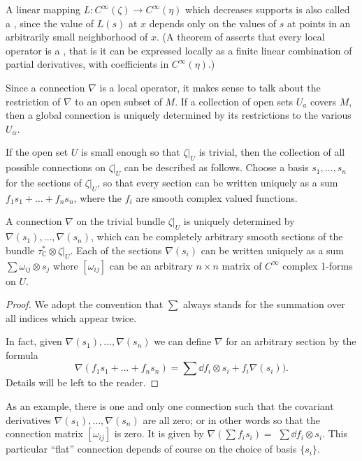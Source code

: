 \documentclass[../main]{subfiles}
\begin{document}
\begin{remark*}
A linear mapping $L: C^\infty (\zeta) \rightarrow C^\infty (\eta)$ which decreases supports is also called a , since the value of $L(s)$ at $x$ depends only on the values of $s$ at points in an arbitrarily small neighborhood of $x$. (A theorem of \cite{peetre} asserts that every local operator is a , that is it can be expressed locally as a finite linear combination of partial derivatives, with coefficients in $C^\infty (\eta)$.)
\end{remark*}

Since a connection $\nabla$ is a local operator, it makes sense to talk about the restriction of $\nabla$ to an open subset of $M$. If a collection of open sets $U_{a}$ covers $M$, then a global connection is uniquely determined by its restrictions to the various $U_{\alpha}$.

If the open set $U$ is small enough so that $\zeta |_U$ is trivial, then the collection of all possible connections on $\zeta |_U$ can be described as follows. Choose a basis $s_{1}, \ldots, s_{n}$ for the sections of $\zeta |_U$, so that every section can be written uniquely as a sum $f_{1} s_{1}+\ldots+f_{n} s_{n}$, where the $f_{i}$ are smooth complex valued functions.

\begin{lemma}
A connection $\nabla$ on the trivial bundle $\zeta |_U$ is uniquely determined by $\nabla(s_{1}), \ldots, \nabla(s_{n})$, which can be completely arbitrary smooth sections of the bundle $\tau_{\mathbb{C}}^{*} \otimes \zeta |_U$. Each of the sections $\nabla(s_{i})$ can be written uniquely as a sum $\sum \omega_{i j} \otimes s_{j}$ where $[\omega_{i j}]$ can be an arbitrary $n \times n$ matrix of $C^\infty $ complex 1-forms on $U$.
\end{lemma}

\begin{proof}
We adopt the convention that $\sum$ always stands for the summation over all indices which appear twice.

In fact, given $\nabla(s_{1}), \ldots, \nabla(s_{n})$ we can define $\nabla$ for an arbitrary section by the formula
\[ \nabla(f_{1} s_{1}+\ldots+f_{n} s_{n})=\sum \dd f_{i} \otimes s_{i}+f_{i} \nabla(s_{i})).\]  Details will be left to the reader.
\end{proof}

As an example, there is one and only one connection such that the covariant derivatives $\nabla(s_{1}), \ldots, \nabla(s_{n})$ are all zero; or in other words so that the connection matrix $[\omega_{i j}]$ is zero. It is given by $\nabla(\sum f_{i} s_{i})=$ $\sum \dd f_{i} \otimes s_{i}$. This particular ``flat'' connection depends of course on the choice of basis $\{s_{i}\}$.
\end{document}
